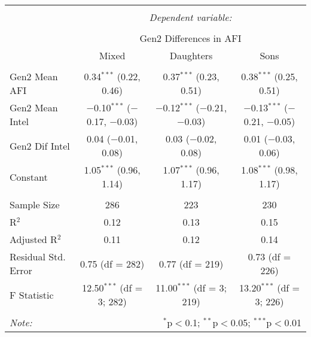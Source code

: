
\begingroup 
\small 
\begin{tabular}{@{\extracolsep{1pt}}lccc} 
\\[-1.8ex]\hline 
\hline \\[-1.8ex] 
 & \multicolumn{3}{c}{\textit{Dependent variable:}} \\ 
\cline{2-4} 
\\[-1.8ex] & \multicolumn{3}{c}{Gen2 Differences in AFI} \\ 
 & Mixed & Daughters & Sons \\ 
\hline \\[-1.8ex] 
 Gen2 Mean AFI & 0.34$^{***}$ (0.22, 0.46) & 0.37$^{***}$ (0.23, 0.51) & 0.38$^{***}$ (0.25, 0.51) \\ 
  Gen2 Mean Intel & $-$0.10$^{***}$ ($-$0.17, $-$0.03) & $-$0.12$^{***}$ ($-$0.21, $-$0.03) & $-$0.13$^{***}$ ($-$0.21, $-$0.05) \\ 
  Gen2 Dif Intel & 0.04 ($-$0.01, 0.08) & 0.03 ($-$0.02, 0.08) & 0.01 ($-$0.03, 0.06) \\ 
  Constant & 1.05$^{***}$ (0.96, 1.14) & 1.07$^{***}$ (0.96, 1.17) & 1.08$^{***}$ (0.98, 1.17) \\ 
 \hline \\[-1.8ex] 
Sample Size & 286 & 223 & 230 \\ 
R$^{2}$ & 0.12 & 0.13 & 0.15 \\ 
Adjusted R$^{2}$ & 0.11 & 0.12 & 0.14 \\ 
Residual Std. Error & 0.75 (df = 282) & 0.77 (df = 219) & 0.73 (df = 226) \\ 
F Statistic & 12.50$^{***}$ (df = 3; 282) & 11.00$^{***}$ (df = 3; 219) & 13.20$^{***}$ (df = 3; 226) \\ 
\hline 
\hline \\[-1.8ex] 
\textit{Note:}  & \multicolumn{3}{r}{$^{*}$p$<$0.1; $^{**}$p$<$0.05; $^{***}$p$<$0.01} \\ 
\end{tabular} 
\endgroup 
